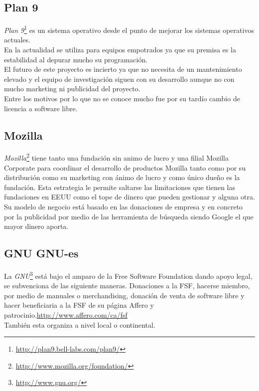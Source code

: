 \documentclass[12pt]{article} %
\begin{document}
\subsection{Plan 9} %

\emph{Plan 9}\footnote{\url{http://plan9.bell-labs.com/plan9/}} es un sistema operativo desde el punto de mejorar los sistemas operativos actuales.\\En la actualidad se utiliza para equipos empotrados ya que su premisa es la estabilidad al depurar mucho su programación.\\El futuro de este proyecto es incierto ya que no necesita de un mantenimiento elevado y el equipo de investigación siguen con su desarrollo aunque no con mucho marketing ni publicidad del proyecto.\\Entre los motivos por lo que no se conoce mucho fue por su tardío cambio de licencia a software libre. 
\subsection{Mozilla} %

\emph{Mozilla}\footnote{\url{http://www.mozilla.org/foundation/}} tiene tanto una fundación sin animo de lucro y una filial Mozilla Corporate para coordinar el desarrollo de productos Mozilla tanto como por su distribución como su marketing con ánimo de lucro y como único dueño es la fundación. Esta estrategia le permite saltarse las limitaciones que tienen las fundaciones en EEUU como el tope de dinero que pueden gestionar y alguna otra.\\ Su modelo de negocio está basado en las donaciones de empresa y en concreto por la publicidad por medio de las herramienta de búsqueda siendo Google el que mayor dinero aporta.
\subsection{GNU GNU-es} %
La \emph{GNU}\footnote{\url{http://www.gnu.org/}} está bajo el amparo de la Free Software Foundation dando apoyo legal, se subvenciona de las siguiente maneras. Donaciones a la FSF, hacerse miembro, por medio de manuales o merchandising, donación de venta de software libre y hacer beneficiaria a la FSF de su página Affero y patrocinio.\url{http://www.affero.com/ca/fsf}\\También esta organiza a nivel local o continental.
\end{document}
